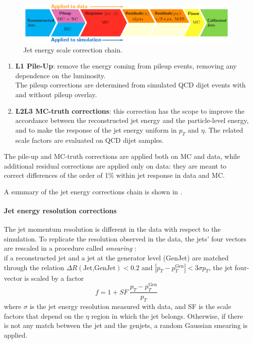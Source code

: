 \begin{figure}[H]
    \centering
    \includegraphics[width=\linewidth]{fig//chap07-selection/JEC.png}
    \caption{Jet energy scale correction chain.}
    \label{fig:jerc}
\end{figure}
\begin{enumerate}
    \item \textbf{L1 Pile-Up}: remove the energy coming from pileup events, removing any dependence on the luminosity.\\
    The pileup corrections are determined from simulated QCD dijet events with and without pileup overlay.
    \item \textbf{L2L3 MC-truth corrections}: this correction has the scope to improve the accordance between the reconstructed jet energy and the particle-level energy, and to make the response of the jet energy uniform in $p_T$ and $\eta$. The related scale factors are evaluated on QCD dijet samples.
\end{enumerate}
The pile-up and MC-truth corrections are applied both on MC and data, while additional residual corrections are applied only on data: they are meant to correct differences of the order of 1\% within jet response in data and MC.

A summary of the jet energy corrections chain is shown in .

\paragraph*{Jet energy resolution corrections}
The jet momentum resolution is different in the data with respect to the simulation. To replicate the resolution observed in the data, the jets' four vectors are rescaled in a procedure called \emph{smearing} \cite{2021Jet13TeV}:\\
if a reconstructed jet and a jet at the generator level (GenJet) are matched through the relation $\Delta R(\text{Jet,GenJet})<0.2$ and $|p_T-p_T^{\text{Gen}}|<3\sigma p_T$, the jet four-vector is scaled by a factor
\begin{equation}
    f=1+\textit{SF}\:\frac{p_T-p_T^{\text{Gen}}}{p_T}
\end{equation}
where $\sigma$ is the jet energy resolution measured with data, and SF is the scale factors that depend on the $\eta$ region in which the jet belongs.
Otherwise, if there is not any match between the jet and the genjets, a random Gaussian smearing is applied.


